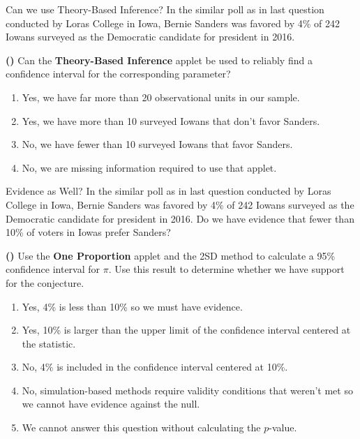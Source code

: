 \documentclass[13pt]{beamer}
\newcounter{count}
\newcommand{\question}{\textbf{(\decimal{count})} \stepcounter{count}}
\newenvironment{click}{\begin{enumerate}[A]}{\end{enumerate}}
\begin{document}
\begin{frame}{Can we use Theory-Based Inference?}
In the similar poll as in last question conducted by Loras College in Iowa, Bernie Sanders was favored by 4\% of 242 Iowans surveyed as the Democratic candidate for president in 2016.  

\question Can the \textbf{Theory-Based Inference} applet be used to reliably find a confidence interval for the corresponding parameter?

\begin{click}
	\item Yes, we have far more than 20 observational units in our sample.
    \item Yes, we have more than 10 surveyed Iowans that don't favor Sanders.
    \item No, we have fewer than 10 surveyed Iowans that favor Sanders. %
    \item No, we are missing information required to use that applet.
\end{click}

\end{frame}


\begin{frame}{Evidence as Well?}
In the similar poll as in last question conducted by Loras College in Iowa, Bernie Sanders was favored by 4\% of 242 Iowans surveyed as the Democratic candidate for president in 2016.  Do we have evidence that fewer than 10\% of voters in Iowas prefer Sanders?

\question Use the \textbf{One Proportion} applet and the 2SD method to calculate a 95\% confidence interval for $\pi$.  Use this result to determine whether we have support for the conjecture.

\begin{click}
	\item Yes, 4\% is less than 10\% so we must have evidence.
    \item Yes, 10\% is larger than the upper limit of the confidence interval centered at the statistic. %
    \item No, 4\% is included in the confidence interval centered at 10\%.
    \item No, simulation-based methods require validity conditions that weren't met so we cannot have evidence against the null.
    \item We cannot answer this question without calculating the $p$-value.
\end{click}

\end{frame}
\end{document}
